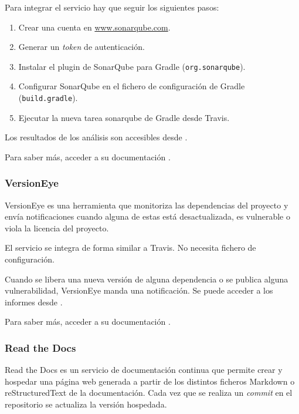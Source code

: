 Para integrar el servicio hay que seguir los siguientes pasos:

\begin{enumerate}
\def\labelenumi{\arabic{enumi}.}
\tightlist
\item
  Crear una cuenta en
  \href{http://www.sonarqube.com}{www.sonarqube.com}.
\item
  Generar un \emph{token} de autenticación.
\item
  Instalar el plugin de SonarQube para Gradle (\texttt{org.sonarqube}).
\item
  Configurar SonarQube en el fichero de configuración de Gradle
  (\texttt{build.gradle}).
\item
  Ejecutar la nueva tarea sonarqube de Gradle desde Travis.
\end{enumerate}


Los resultados de los análisis son accesibles desde
\citep{sonarqube:gobees}.


Para saber más, acceder a su documentación \citep{sonarqube:doc}.

\subsubsection{VersionEye}\label{versioneye}

VersionEye es una herramienta que monitoriza las dependencias del
proyecto y envía notificaciones cuando alguna de estas está
desactualizada, es vulnerable o viola la licencia del proyecto.

El servicio se integra de forma similar a Travis. No necesita fichero de
configuración.

Cuando se libera una nueva versión de alguna dependencia o se publica
alguna vulnerabilidad, VersionEye manda una notificación. Se puede
acceder a los informes desde \citep{versioneye:gobees}.


Para saber más, acceder a su documentación \citep{versioneye:doc}.

\subsubsection{Read the Docs}\label{read-the-docs}

Read the Docs es un servicio de documentación continua que permite crear
y hospedar una página web generada a partir de los distintos ficheros
Markdown o reStructuredText de la documentación. Cada vez que se realiza
un \emph{commit} en el repositorio se actualiza la versión hospedada.

